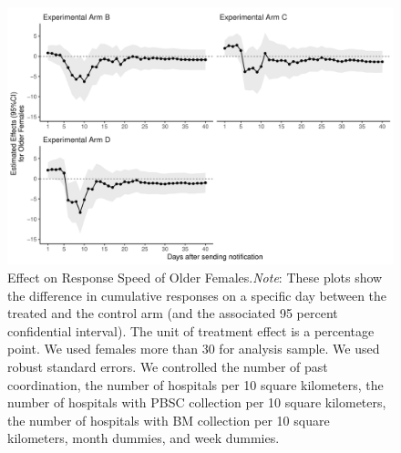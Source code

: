 \documentclass[12pt, a4paper]{article}
\begin{document}
\begin{figure}[H]
\includegraphics{JMDP RCT - Main Document_files/figure-latex/old-female-flow-1} \caption{Effect on Response Speed of Older Females.\newline \emph{Note}: These plots show the difference in cumulative responses on a specific day between the treated and the control arm (and the associated 95 percent confidential interval). The unit of treatment effect is a percentage point. We used females more than 30 for analysis sample. We used robust standard errors. We controlled the number of past coordination, the number of hospitals per 10 square kilometers, the number of hospitals with PBSC collection per 10 square kilometers, the number of hospitals with BM collection per 10 square kilometers, month dummies, and week dummies.}\label{fig:old-female-flow}
\end{figure}
\end{document}
